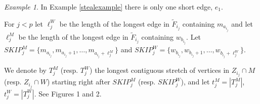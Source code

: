 \documentclass{amsart}
\theoremstyle{remark}
\newtheorem{remark}[theorem]{Remark}
\newtheorem{example}[theorem]{Example}
\newcommand{\ljm}{{\ell}_{j}^M}
\newcommand{\ljw}{{\ell}_{j}^W}
\newcommand{\skipjm}{{SKIP}^M_j}
\newcommand{\skipjw}{{SKIP}^W_j}
\newcommand{\tfij}{\tilde{F}_{i_j}}
\begin{document}
\begin{example}
In Example \ref{stealexample} there is only one short edge, $e_1$.
\end{example}



For $j<p$ let $\ell_j^W$ be the length of the longest edge in
$\tfij$ containing $m_{a_{i_j}}$ and let $\ell_j^M$ be the length of
the longest edge in $\tfij$ containing $w_{b_{i_j}}$. Let
$SKIP^M_j=\{m_{a_{i_j}}, m_{a_{i_j}+1}, \ldots, m_{a_{i_j}+\ljm}\}$
and
 $SKIP^W_j=\{w_{b_{i_j}}, w_{b_{i_j}+1}, \ldots, w_{b_{i_j}+\ljw}\}$.

We  denote by $T_j^M$ (resp. $T_j^W$) the longest contiguous stretch of vertices in $Z_{i_j} \cap M$ (resp. $Z_{i_j} \cap W$)  starting right after $\skipjm$ (resp. $\skipjw$),
and let $t_j^M=|T_j^M|$, $t_j^W=|T_j^W|$. See Figures 1 and 2.









\end{document}
